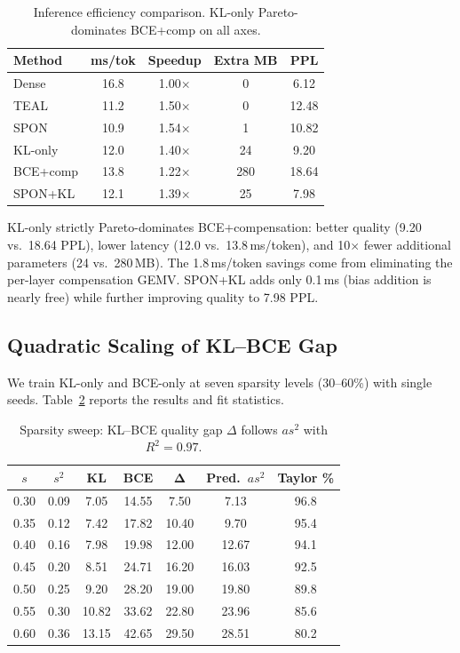 \documentclass[11pt,a4paper]{article}
\begin{document}
\begin{table}[t]
\centering
\small
\caption{Inference efficiency comparison. KL-only Pareto-dominates BCE+comp on all axes.}
\label{tab:latency}
\begin{tabular}{lcccc}
\toprule
\textbf{Method} & \textbf{ms/tok} & \textbf{Speedup} & \textbf{Extra MB} & \textbf{PPL} \\
\midrule
Dense & 16.8 & 1.00$\times$ & 0 & 6.12 \\
TEAL & 11.2 & 1.50$\times$ & 0 & 12.48 \\
SPON & 10.9 & 1.54$\times$ & 1 & 10.82 \\
KL-only & 12.0 & 1.40$\times$ & 24 & 9.20 \\
BCE+comp & 13.8 & 1.22$\times$ & 280 & 18.64 \\
SPON+KL & 12.1 & 1.39$\times$ & 25 & 7.98 \\
\bottomrule
\end{tabular}
\end{table}

KL-only strictly Pareto-dominates BCE+compensation: better quality (9.20 vs.\ 18.64 PPL), lower latency (12.0 vs.\ 13.8\,ms/token), and 10$\times$ fewer additional parameters (24 vs.\ 280\,MB).
The 1.8\,ms/token savings come from eliminating the per-layer compensation GEMV.
SPON+KL adds only 0.1\,ms (bias addition is nearly free) while further improving quality to 7.98 PPL.

\subsection{Quadratic Scaling of KL--BCE Gap}
\label{sec:scaling}

We train KL-only and BCE-only at seven sparsity levels (30--60\%) with single seeds.
Table~\ref{tab:sweep} reports the results and fit statistics.

\begin{table}[t]
\centering
\small
\caption{Sparsity sweep: KL--BCE quality gap $\Delta$ follows $as^2$ with $R^2 = 0.97$.}
\label{tab:sweep}
\begin{tabular}{ccccccc}
\toprule
$s$ & $s^2$ & \textbf{KL} & \textbf{BCE} & $\boldsymbol{\Delta}$ & \textbf{Pred.}\ $as^2$ & \textbf{Taylor \%} \\
\midrule
0.30 & 0.09 & 7.05 & 14.55 & 7.50 & 7.13 & 96.8 \\
0.35 & 0.12 & 7.42 & 17.82 & 10.40 & 9.70 & 95.4 \\
0.40 & 0.16 & 7.98 & 19.98 & 12.00 & 12.67 & 94.1 \\
0.45 & 0.20 & 8.51 & 24.71 & 16.20 & 16.03 & 92.5 \\
0.50 & 0.25 & 9.20 & 28.20 & 19.00 & 19.80 & 89.8 \\
0.55 & 0.30 & 10.82 & 33.62 & 22.80 & 23.96 & 85.6 \\
0.60 & 0.36 & 13.15 & 42.65 & 29.50 & 28.51 & 80.2 \\
\bottomrule
\end{tabular}
\end{table}
\end{document}
